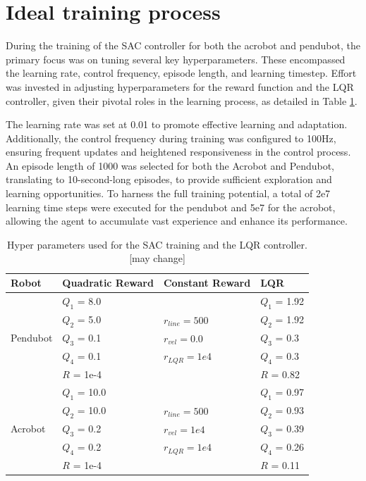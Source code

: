 \section{Ideal training process}
During the training of the SAC controller for both the acrobot and pendubot, the primary focus was on tuning several key hyperparameters. These encompassed the learning rate, control frequency, episode length, and learning timestep. Effort was invested in adjusting hyperparameters for the reward function and the LQR controller, given their pivotal roles in the learning process, as detailed in Table \ref{tab:training_parameters}.

The learning rate was set at 0.01 to promote effective learning and adaptation. Additionally, the control frequency during training was configured to 100Hz, ensuring frequent updates and heightened responsiveness in the control process. An episode length of 1000 was selected for both the Acrobot and Pendubot, translating to 10-second-long episodes, to provide sufficient exploration and learning opportunities. To harness the full training potential, a total of 2e7 learning time steps were executed for the pendubot and 5e7 for the acrobot, allowing the agent to accumulate vast experience and enhance its performance.

\begin{table}[H]
  \centering
  \begin{tabular}{p{2cm} | p{3cm} | p{3cm} | p{3cm}}
  Robot & Quadratic Reward  & Constant Reward & LQR\\
  \hline
  \multirow{5}{*}{Pendubot} & \(Q_1\) = 8.0  &  & \(Q_1\) = 1.92\\
  & \(Q_2\) = 5.0  & \(r_{line}=500\) & \(Q_2\) = 1.92\\
  & \(Q_3\) = 0.1  & \(r_{vel}=0.0\) & \(Q_3\) = 0.3\\
  & \(Q_4\) = 0.1  & \(r_{LQR}=1e4\)& \(Q_4\) = 0.3\\
  & \(R\) = 1e-4  & & \(R\) = 0.82\\
  \hline
  \multirow{5}{*}{Acrobot} & \(Q_1\) = 10.0  &  & \(Q_1\) = 0.97\\
  & \(Q_2\) = 10.0  & \(r_{line}=500\) & \(Q_2\) = 0.93\\
  & \(Q_3\) = 0.2  & \(r_{vel}=1e4\) & \(Q_3\) = 0.39\\
  & \(Q_4\) = 0.2  & \(r_{LQR}=1e4\) & \(Q_4\) = 0.26\\
  & \(R\) = 1e-4  &  & \(R\) = 0.11\\
  \end{tabular}
 \caption{Hyper parameters used for the SAC training and the LQR controller.[may change]}
 \label{tab:training_parameters}
\end{table}

